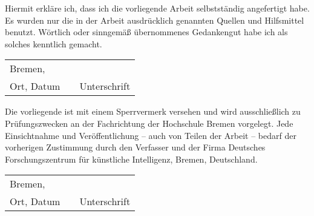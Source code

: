 \thispagestyle{plain}       %

\vspace{5ex}
\vspace{3ex}
Hiermit erkläre ich, dass ich die vorliegende Arbeit selbstständig angefertigt habe. Es wurden nur die in der Arbeit ausdrücklich genannten Quellen und Hilfsmittel benutzt. Wörtlich oder sinngemäß übernommenes Gedankengut habe ich als solches kenntlich gemacht.
\vspace{5ex}

\begin{tabular}[h]{lp{2cm}p{5.5cm}}
  \centering
  Bremen, \hspace{2.5cm} &  &  \\
  \cline{1-1} \cline{3-3}
  \sffamily\scriptsize{Ort, Datum}  &  &  \sffamily\scriptsize{Unterschrift}\\
\end{tabular}

\vfill

\vspace{3ex}
Die vorliegende \art ist mit einem Sperrvermerk versehen und wird ausschließlich zu Prüfungszwecken an der Fachrichtung \textit{\fachrichtung} der Hochschule Bremen vorgelegt. Jede Einsichtnahme und Veröffentlichung -- auch von Teilen der Arbeit -- bedarf der vorherigen Zustimmung durch den Verfasser und der Firma Deutsches Forschungszentrum für künstliche Intelligenz, Bremen, Deutschland.

\vspace{5ex}

\begin{tabular}[h]{lp{2cm}p{5.5cm}}
  \centering
  Bremen, \hspace{2.5cm} &  &  \\
  \cline{1-1} \cline{3-3}
  \sffamily\scriptsize{Ort, Datum}  &  &  \sffamily\scriptsize{Unterschrift}\\
\end{tabular}
